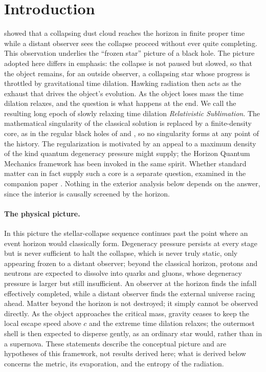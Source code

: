 \documentclass[11pt]{article}
\begin{document}
\section{Introduction}
\label{sec:intro}

\citet{OppenheimerSnyder1939} showed that a collapsing dust cloud reaches the horizon in finite proper time while a distant observer sees the collapse proceed without ever quite completing. This observation underlies the ``frozen star'' picture of a black hole. The picture adopted here differs in emphasis: the collapse is not paused but slowed, so that the object remains, for an outside observer, a collapsing star whose progress is throttled by gravitational time dilation. Hawking radiation then acts as the exhaust that drives the object's evolution. As the object loses mass the time dilation relaxes, and the question is what happens at the end. We call the resulting long epoch of slowly relaxing time dilation \emph{Relativistic Sublimation}. The mathematical singularity of the classical solution is replaced by a finite-density core, as in the regular black holes of \citet{Bardeen1968} and \citet{Hayward2006}, so no singularity forms at any point of the history. The regularization is motivated by an appeal to a maximum density of the kind quantum degeneracy pressure might supply; the Horizon Quantum Mechanics framework \citep{CasadioGiugnoMicu2016} has been invoked in the same spirit. Whether standard matter can in fact supply such a core is a separate question, examined in the companion paper \citep{PaperB}. Nothing in the exterior analysis below depends on the answer, since the interior is causally screened by the horizon.

\paragraph{The physical picture.} In this picture the stellar-collapse sequence continues past the point where an event horizon would classically form. Degeneracy pressure persists at every stage but is never sufficient to halt the collapse, which is never truly static, only appearing frozen to a distant observer; beyond the classical horizon, protons and neutrons are expected to dissolve into quarks and gluons, whose degeneracy pressure is larger but still insufficient. An observer at the horizon finds the infall effectively completed, while a distant observer finds the external universe racing ahead. Matter beyond the horizon is not destroyed; it simply cannot be observed directly. As the object approaches the critical mass, gravity ceases to keep the local escape speed above $c$ and the extreme time dilation relaxes; the outermost shell is then expected to disperse gently, as an ordinary star would, rather than in a supernova. These statements describe the conceptual picture and are hypotheses of this framework, not results derived here; what is derived below concerns the metric, its evaporation, and the entropy of the radiation.
\end{document}
